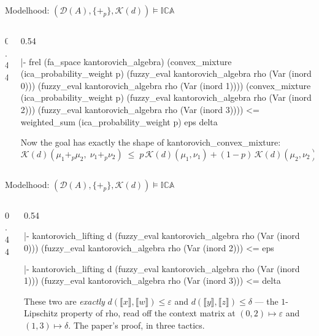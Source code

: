 \documentclass[10pt,aspectratio=169]{beamer}
\newcommand{\den}[1]{\llbracket #1 \rrbracket}
\newcommand{\ICA}{\mathbb{I}\mathbb{C}\mathbb{A}}
\newcommand{\Dist}{\mathcal{D}}
\newcommand{\eps}{\varepsilon}
\newcommand{\Kan}{\mathcal{K}}
\newcommand{\bpl}[1]{+_{#1}}
\newcommand{\rid}[1]{{\ttfamily\small #1}}
\begin{document}
\begin{frame}[fragile]{Modelhood: $(\Dist(A),\{\bpl{p}\},\Kan(d)) \models \ICA$}
  \begin{columns}[T]
  \begin{column}{0.44\textwidth}\end{column}
  \begin{column}{0.54\textwidth}
    \begin{goalbox}[title={Goal 4 / 4, after \texttt{rewrite !kantorovich\_eval\_op}}]
\begin{gconc}
|- frel (fa_space kantorovich_algebra)
     (convex_mixture (ica_probability_weight p)
        (fuzzy_eval kantorovich_algebra rho (Var (inord 0)))
        (fuzzy_eval kantorovich_algebra rho (Var (inord 1))))
     (convex_mixture (ica_probability_weight p)
        (fuzzy_eval kantorovich_algebra rho (Var (inord 2)))
        (fuzzy_eval kantorovich_algebra rho (Var (inord 3))))
   <= weighted_sum (ica_probability_weight p) eps delta
\end{gconc}
    \end{goalbox}
    \smallskip
    {\footnotesize Now the goal has exactly the shape of
    \rid{kantorovich\_convex\_mixture}:
    \[
      \Kan(d)(\mu_1 \bpl{p} \mu_2,\; \nu_1 \bpl{p} \nu_2)
      \;\leq\; p\,\Kan(d)(\mu_1,\nu_1) + (1-p)\,\Kan(d)(\mu_2,\nu_2).
    \]}
  \end{column}
  \end{columns}
\end{frame}

\begin{frame}[fragile]{Modelhood: $(\Dist(A),\{\bpl{p}\},\Kan(d)) \models \ICA$}
  \begin{columns}[T]
  \begin{column}{0.44\textwidth}\end{column}
  \begin{column}{0.54\textwidth}
    \begin{goalbox}[title={Goal 1 / 2, after \texttt{apply: weighted\_sum\_le}}]
\begin{gconc}
|- kantorovich_lifting d
     (fuzzy_eval kantorovich_algebra rho (Var (inord 0)))
     (fuzzy_eval kantorovich_algebra rho (Var (inord 2)))
   <= eps
\end{gconc}
    \end{goalbox}
    \begin{goalbox}[title={Goal 2 / 2}]
\begin{gconc}
|- kantorovich_lifting d
     (fuzzy_eval kantorovich_algebra rho (Var (inord 1)))
     (fuzzy_eval kantorovich_algebra rho (Var (inord 3)))
   <= delta
\end{gconc}
    \end{goalbox}
    {\footnotesize These two are \emph{exactly}
    $d(\den{x},\den{w}) \leq \eps$ and
    $d(\den{y},\den{z}) \leq \delta$ --- the $1$-Lipschitz property of
    \rid{rho}, read off the context matrix at
    $(0,2) \mapsto \eps$ and $(1,3) \mapsto \delta$. The paper's proof,
    in three tactics.}
  \end{column}
  \end{columns}
\end{frame}
\end{document}
